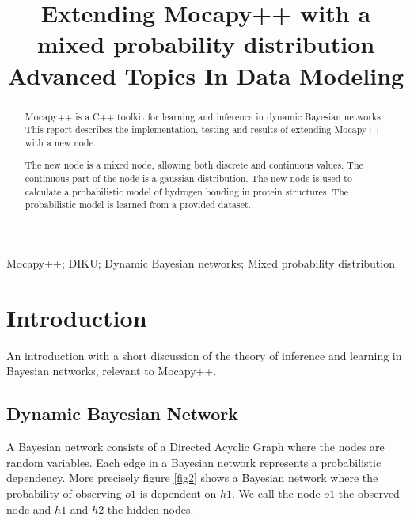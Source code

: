 \documentclass[10pt, journal, compsocconf,a4paper]{IEEEtran}
\begin{document}
\title{Extending Mocapy++ with a mixed probability distribution\\Advanced Topics In Data Modeling}

\author{
}

\maketitle

\begin{abstract}
Mocapy++ is a C++ toolkit for learning and inference in dynamic Bayesian networks. This report describes the implementation, testing and results of extending Mocapy++ with a new node. 

The new node is a mixed node, allowing both discrete and continuous values. The continuous part of the node is a gaussian distribution. The new node is used to calculate a probabilistic model of hydrogen bonding in protein structures. The probabilistic model is learned from a provided dataset.
\end{abstract}

\begin{IEEEkeywords}
Mocapy++; DIKU; Dynamic Bayesian networks; Mixed probability distribution
\end{IEEEkeywords}


\section{Introduction} %
\label{sec:introduction}

% 
% 

An introduction with a short discussion of the theory of inference and learning in Bayesian networks, relevant to Mocapy++.


\subsection{Dynamic Bayesian Network} %
\label{sub:dynamic_bayesian_network}
A Bayesian network consists of a Directed Acyclic Graph where the nodes are random variables. Each edge in a Bayesian network represents a probabilistic dependency. More precisely figure \ref{fig2} shows a Bayesian network where the probability of observing $o1$ is dependent on $h1$. We call the node $o1$ the observed node and $h1$ and $h2$ the hidden nodes. 
\end{document}
